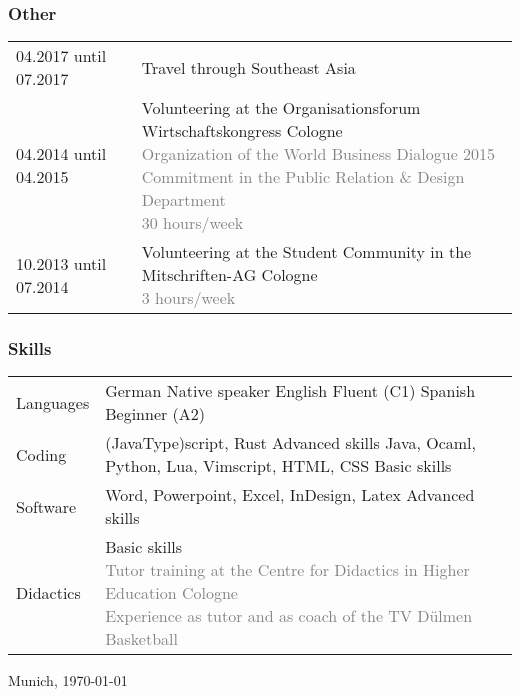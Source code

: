 \documentclass[USenglish]{article} %
\newcommand{\city}{Munich}
\begin{document}
\pagebreak
\subsubsection*{Other}
\begin{table}[h]
  \begin{tabularx}{\textwidth}{@{}p{4cm}X}

    04.2017 until 07.2017 &
    Travel through Southeast Asia \\

    04.2014 until 04.2015 &
    Volunteering at the Organisationsforum Wirtschaftskongress \textbar{} Cologne
    \textcolor{gray}{
      \newline Organization of the World Business Dialogue 2015
      \newline Commitment in the Public Relation \& Design Department
      \newline 30 hours/week} \\

    10.2013 until 07.2014 &
    Volunteering at the Student Community in the Mitschriften-AG \textbar{} Cologne
    \textcolor{gray}{
      \newline 3 hours/week} \\

  \end{tabularx}\label{tab:other}
\end{table}

\subsubsection*{Skills}
\begin{table}[h!]
  \begin{tabularx}{\textwidth}{@{}p{4cm}X}

    Languages &
    German \textbar{} Native speaker
    \newline English \textbar{} Fluent (C1)
    \newline Spanish \textbar{} Beginner (A2) \\

    Coding &
    (Java\textbar{}Type)script, Rust \textbar{} Advanced skills \newline
    Java, Ocaml, Python, Lua, Vimscript, HTML, CSS \textbar{} Basic skills \\

    Software &
    Word, Powerpoint, Excel, InDesign, Latex \textbar{} Advanced skills \\

    Didactics &
    Basic skills
    \textcolor{gray}{
      \newline Tutor training at the Centre for Didactics in Higher Education Cologne
      \newline Experience as tutor and as coach of the TV Dülmen Basketball} \\

  \end{tabularx}\label{tab:skills}
\end{table}

\bigskip
\bigskip
\makebox[2.5in]{\hrulefill}\newline{}
\small\city{}, \today{} \\
\end{document}
